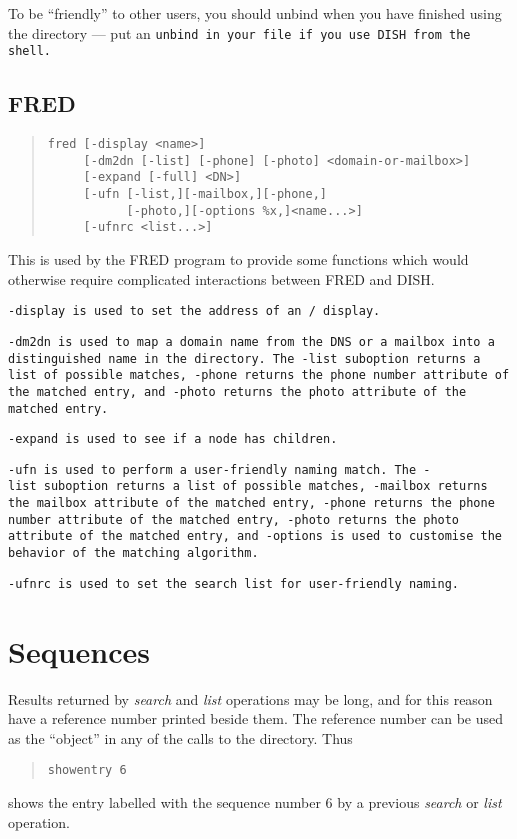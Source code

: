 To be ``friendly''
to other users, you should unbind 
when you have finished using the directory --- put an \tt unbind\rm \ in
your  file if you use DISH from the shell.

\subsection{FRED}
\label{dish_fred}

\begin{small}\begin{quote}\begin{verbatim}
fred [-display <name>]
     [-dm2dn [-list] [-phone] [-photo] <domain-or-mailbox>]
     [-expand [-full] <DN>]
     [-ufn [-list,][-mailbox,][-phone,]
           [-photo,][-options %x,]<name...>]
     [-ufnrc <list...>]
\end{verbatim}\end{quote}\end{small}

This is used by the FRED program to provide some functions which would
otherwise  require
complicated interactions between FRED and DISH.

\tt -display\rm\ is used to set the address of an \xwindows/ display.

\tt -dm2dn\rm\ is used to map a domain name from the DNS or a mailbox into a
distinguished name in the directory.
The \tt -list\rm\ suboption returns a list of possible matches, 
\tt -phone\rm\ returns the phone number attribute of the matched
entry, and
\tt -photo\rm\ returns the photo attribute of the matched entry.

\tt -expand\rm\ is used to see if a node has children.

\tt -ufn\rm\ is used to perform a user-friendly naming match.
The \tt -list\rm\ suboption returns a list of possible matches, 
\tt -mailbox\rm\ returns the mailbox attribute of the matched entry,
\tt -phone\rm\ returns the phone number attribute of the matched entry,
\tt -photo\rm\ returns the photo attribute of the matched entry, and
\tt -options\rm\ is used to customise the behavior of the matching algorithm.

\tt -ufnrc\rm\ is used to set the search list for user-friendly naming.

\section {Sequences}
\label{sequences}

Results returned by {\em search} and {\em list} operations 
may be long, and for 
this reason have a reference number printed beside them.
The reference number can be used as the ``object'' in any of the calls to the 
directory.  Thus
\begin{quote}\begin{verbatim}
showentry 6
\end{verbatim}\end{quote}
shows the entry labelled with the sequence number
6 by a previous {\em search} or {\em list} operation.

